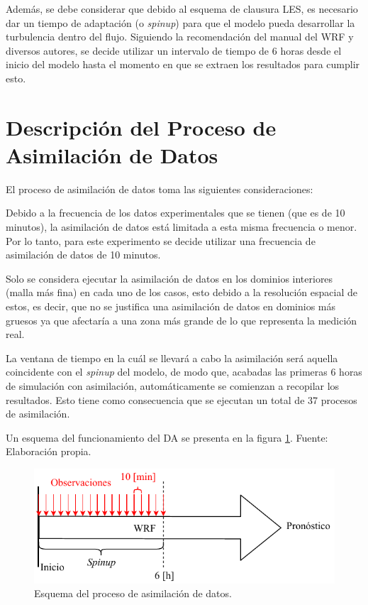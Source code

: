 Además, se debe considerar que debido al esquema de clausura LES, es necesario dar un tiempo de adaptación (o \emph{spinup}) para que el modelo pueda desarrollar la turbulencia dentro del flujo. Siguiendo la recomendación del manual del WRF y diversos autores, se decide utilizar un intervalo de tiempo de 6 horas desde el inicio del modelo hasta el momento en que se extraen los resultados para cumplir esto.

\newpage
\section{Descripción del Proceso de Asimilación de Datos}
El proceso de asimilación de datos toma las siguientes consideraciones:
\begin{itemize*}
	\item Debido a la frecuencia de los datos experimentales que se tienen (que es de 10 minutos), la asimilación de datos está limitada a esta misma frecuencia o menor. Por lo tanto, para este experimento se decide utilizar una frecuencia de asimilación de datos de 10 minutos.
	\item Solo se considera ejecutar la asimilación de datos en los dominios interiores (malla más fina) en cada uno de los casos, esto debido a la resolución espacial de estos, es decir, que no se justifica una asimilación de datos en dominios más gruesos ya que afectaría a una zona más grande de lo que representa la medición real.
	\item La ventana de tiempo en la cuál se llevará a cabo la asimilación será aquella coincidente con el \emph{spinup} del modelo, de modo que, acabadas las primeras 6 horas de simulación con asimilación, automáticamente se comienzan a recopilar los resultados. Esto tiene como consecuencia que se ejecutan un total de 37 procesos de asimilación.
\end{itemize*}
Un esquema del funcionamiento del DA se presenta en la figura \ref{fig:05_da}. Fuente: Elaboración propia.

\begin{figure}[H]
	\centering
		\includegraphics[width=0.95\linewidth,page=1,trim={0cm 0cm 0cm 0cm},clip]{Imagenes/05/da}%
	\caption{Esquema del proceso de asimilación de datos.}
	\label{fig:05_da}
\end{figure}

